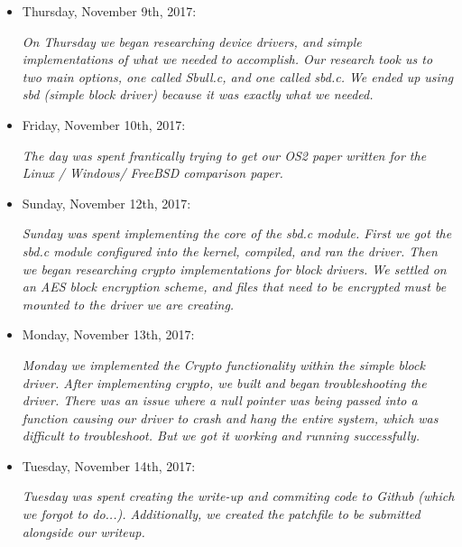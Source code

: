 \documentclass[10pt,drafclsnofoot,onecolumn]{IEEEtran}
\begin{document}
\begin{itemize}
\item{Thursday, November 9th, 2017:}

\textsl{On Thursday we began researching device drivers, and simple implementations of what we needed to accomplish. Our research took us to two main options, one called Sbull.c, and one called sbd.c. We ended up using sbd (simple block driver) because it was exactly what we needed. }

\item{Friday, November 10th, 2017:}

\textsl{The day was spent frantically trying to get our OS2 paper written for the Linux / Windows/ FreeBSD comparison paper.}


\item{Sunday, November 12th, 2017:}

\textsl{Sunday was spent implementing the core of the sbd.c module. First we got the sbd.c module configured into the kernel, compiled, and ran the driver. Then we began researching crypto implementations for block drivers. We settled on an AES block encryption scheme, and files that need to be encrypted must be mounted to the driver we are creating.}

\item{Monday, November 13th, 2017:}

\textsl{Monday we implemented the Crypto functionality within the simple block driver. After implementing crypto, we built and began troubleshooting the driver. There was an issue where a null pointer was being passed into a function causing our driver to crash and hang the entire system, which was difficult to troubleshoot. But we got it working and running successfully.}

\item{Tuesday, November 14th, 2017:}

\textsl{Tuesday was spent creating the write-up and commiting code to Github (which we forgot to do...). Additionally, we created the patchfile to be submitted alongside our writeup.}

\end{itemize}
\end{document}

